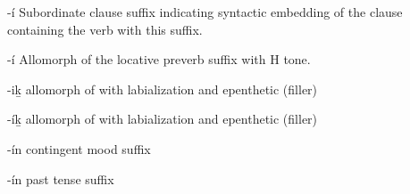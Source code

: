 \begin{morphdesc}[resume*=alphalist]
\item[-í]\label{m:-í-sub}
	Subordinate clause suffix indicating syntactic embedding of the clause containing the
		verb with this suffix.

\item[-í]\label{m:-í-loc}
	Allomorph of the locative preverb suffix  with H tone.

\item[-iḵ]\label{m:-iḵ}
	allomorph of  with labialization and epenthetic (filler) 

\item[-íḵ]\label{m:-íḵ}
	allomorph of  with labialization and epenthetic (filler) 

\item[-ín]\label{m:-ín-ctng}
	contingent mood suffix

\item[-ín]\label{m:-ín-past}
	past tense suffix
\end{morphdesc}
